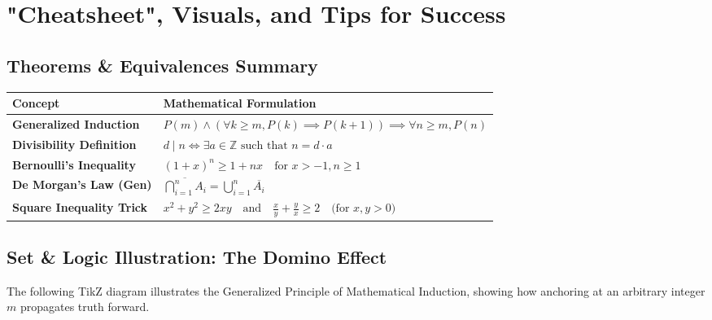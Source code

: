 \documentclass[11pt, a4paper]{article}
\theoremstyle{definition}
\theoremstyle{remark}
\newcommand{\Z}{\mathbb{Z}}
\begin{document}
\newpage

\section{"Cheatsheet", Visuals, and Tips for Success}

\subsection{Theorems \& Equivalences Summary}
\renewcommand{\arraystretch}{1.5}
\begin{tabularx}{\textwidth}{l X}
\toprule
\textbf{Concept} & \textbf{Mathematical Formulation} \\
\midrule
\textbf{Generalized Induction} & $\displaystyle P(m) \land \left( \forall k \ge m, P(k) \implies P(k+1) \right) \implies \forall n \ge m, P(n)$ \\
\textbf{Divisibility Definition} & $\displaystyle d \mid n \iff \exists a \in \Z \text{ such that } n = d \cdot a$ \\
\textbf{Bernoulli's Inequality} & $\displaystyle (1+x)^n \ge 1+nx \quad \text{for } x > -1, n \ge 1$ \\
\textbf{De Morgan's Law (Gen)} & $\displaystyle \overline{\bigcap_{i=1}^n A_i} = \bigcup_{i=1}^n \overline{A_i}$ \\
\textbf{Square Inequality Trick} & $\displaystyle x^2 + y^2 \ge 2xy \quad \text{and} \quad \frac{x}{y} + \frac{y}{x} \ge 2 \quad \text{(for } x,y > 0)$ \\
\bottomrule
\end{tabularx}

\vspace{20pt}
\subsection{Set \& Logic Illustration: The Domino Effect}
The following TikZ diagram illustrates the Generalized Principle of Mathematical Induction, showing how anchoring at an arbitrary integer $m$ propagates truth forward.
\end{document}

